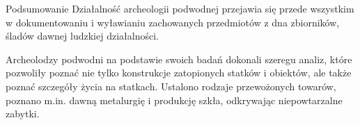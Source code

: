 \documentclass{beamer}
\begin{document}
\begin{frame}{Podsumowanie}
Działalność archeologii podwodnej przejawia się przede wszystkim w dokumentowaniu i wyławianiu zachowanych przedmiotów z dna zbiorników, śladów dawnej ludzkiej działalności.

Archeolodzy podwodni na podstawie swoich badań dokonali szeregu analiz, które pozwoliły poznać nie tylko konstrukcje zatopionych statków i obiektów, ale także poznać szczegóły życia na statkach. Ustalono rodzaje przewożonych towarów, poznano m.in. dawną metalurgię i produkcję szkła, odkrywając niepowtarzalne zabytki.
\end{frame}
\end{document}
